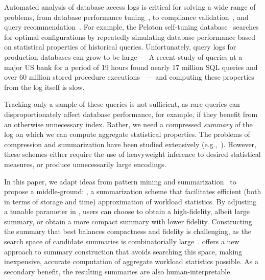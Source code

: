 Automated analysis of database access logs is critical for solving a wide range of problems, from database performance tuning~\cite{DBLP:conf/sigmod/BrunoC05}, to compliance validation~\cite{DBLP:conf/icalp/Dwork06}, and query recommendation~\cite{DBLP:journals/debu/ChatzopoulouEKMPV11}. 
For example, the Peloton self-tuning database~\cite{DBLP:conf/cidr/PavloAALLMMMPQS17} searches for optimal configurations by repeatedly simulating database performance based on statistical properties of historical queries.
Unfortunately, query logs for production databases can grow to be large ---
A recent study of queries at a major US bank for a period of 19 hours found nearly 17 million SQL queries and over 60 million stored procedure executions~\cite{DBLP:conf/www/KulLXCCKU16} --- and computing these properties from the log itself is slow.

Tracking only a sample of these queries is not sufficient, as rare queries can disproportionately affect database performance, for example, if they benefit from an otherwise unnecessary index.
Rather, we need a compressed \emph{summary} of the log on which we can compute aggregate statistical properties.
The problems of compression and summarization have been studied extensively (e.g.,~\cite{DBLP:journals/tit/ZivL77,DBLP:journals/tit/ZivL78,4051119,lee1999learning,DBLP:reference/stat/Jolliffe11,DBLP:journals/cacm/Blei12,DBLP:conf/acl/WangZLG09,DBLP:journals/ai/KnightM02}). 
However, these schemes either require the use of heavyweight inference to desired statistical measures, or produce unnecessarily large encodings.

In this paper, we adapt ideas from pattern mining and summarization~\cite{DBLP:journals/tkdd/MampaeyVT12,DBLP:journals/pvldb/GebalyAGKS14} to propose a middle-ground: \systemname, a summarization scheme that facilitates efficient (both in terms of storage and time) approximation of workload statistics.
By adjusting a tunable parameter in \systemname, users can choose to obtain a high-fidelity, albeit large summary, or obtain a more compact summary with lower fidelity.
Constructing the summary that best balances compactness and fidelity is challenging, as the search space of candidate summaries is combinatorially large~\cite{DBLP:journals/tkdd/MampaeyVT12,DBLP:journals/pvldb/GebalyAGKS14}.
\systemname offers a new approach to summary construction that avoids searching this space, making inexpensive, accurate computation of aggregate workload statistics possible.
As a secondary benefit, the resulting summaries are also human-interpretable.


